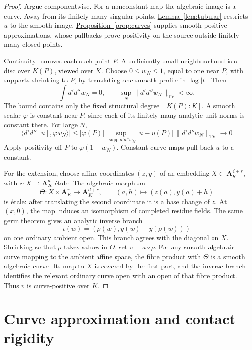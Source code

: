 \documentclass[11pt]{amsart}
\theoremstyle{definition}
\theoremstyle{remark}
\numberwithin{equation}{section}
\newcommand{\ddc}{d'd''}
\newcommand{\Aff}{\mathbf A}
\newcommand{\namedref}[2]{%
 \begingroup
 \ifstrequal{#1}{Section}{\hypersetup{linkcolor=sectionteal}}{%
  \ifstrequal{#1}{Appendix}{\hypersetup{linkcolor=sectionteal}}{}}%
 \hyperref[#2]{#1~\ref*{#2}}%
 \endgroup}
\newcommand{\TV}{\mathrm{TV}}
\DeclareMathOperator{\supp}{supp}
\begin{document}
\begin{proof}
Argue componentwise. For a nonconstant map the algebraic image is a curve. Away from its
finitely many singular points,
\namedref{Lemma}{lem:tubular} restricts \(u\) to the smooth image.
\namedref{Proposition}{prop:curves} supplies smooth positive approximations,
whose pullbacks prove positivity on the source outside finitely many
closed points.

Continuity removes each such point \(P\). A sufficiently small
neighbourhood is a disc over \(K(P)\), viewed over \(K\). Choose
\(0\leq w_N\leq1\), equal to one near \(P\), with supports shrinking
to \(P\), by translating one smooth profile in \(\log|t|\).
Then
\[
 \int\ddc w_N=0,\qquad \sup_N\|\ddc w_N\|_{\TV}<\infty.
\]
The bound contains only the fixed structural degree \([K(P):K]\).
A smooth scalar \(\varphi\) is constant near \(P\), since each of
its finitely many analytic unit norms is constant there. For large \(N\),
\[
 |\langle\ddc[u],\varphi w_N\rangle|
 \leq|\varphi(P)|\,
 \sup_{\supp\ddc w_N}|u-u(P)|\,\|\ddc w_N\|_{\TV}
 \longrightarrow0.
\]
Apply positivity off \(P\) to \(\varphi(1-w_N)\).
Constant curve maps pull back \(u\) to a constant.

For the extension, choose affine coordinates \((z,y)\) of an
embedding \(X\subset\Aff_K^{d+r}\), with \(z:X\to\Aff_K^d\) \'etale.
The algebraic morphism
\[
 \Theta:X\times\Aff_K^r\longrightarrow\Aff_K^{d+r},\qquad
 (a,h)\longmapsto(z(a),y(a)+h)
\]
is \'etale: after translating the second coordinate it is a base
change of \(z\). At \((x,0)\), the map induces an isomorphism of completed residue
fields. The same germ theorem \cite[Theorem 3.4.1]{Ber93} gives an
analytic inverse branch
\[
 \iota(w)=(\rho(w),y(w)-y(\rho(w)))
\]
on one ordinary ambient open. This branch agrees with the diagonal
on \(X\). Shrinking so that \(\rho\) takes values in \(O\), set
\(v=u\circ\rho\).
For any smooth algebraic curve mapping to the ambient affine space,
the fibre product with \(\Theta\) is a smooth algebraic curve.
Its map to \(X\) is covered by the first part, and the inverse
branch identifies the relevant ordinary curve open with an open
of that fibre product. Thus \(v\) is curve-positive over \(K\).
\end{proof}

\section{Curve approximation and contact rigidity}\label{sec:contact}
\end{document}
